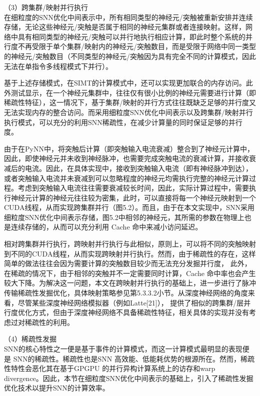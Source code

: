 （3）跨集群/映射并行执行\\
在细粒度的SNN优化中间表示中，所有相同类型的神经元/突触被重新安排并连续存储，无论这些神经元/突触是否属于相同的神经元集群或者连接映射。这样，网络中具有相同类型的神经元/突触可以并行地执行相应计算，即此时整个系统的并行度不再受限于单个集群/映射内的神经元/突触数目，而是受限于网络中同一类型的神经元/突触数目（不同类型的神经元/突触因为具有完全不同的计算模式，因此无法在单指令多线程模式下并行）。

基于上述存储模式，在SIMT的计算模式中，还可以实现更加联合的内存访问。此外测试显示，在一个神经元集群中，往往仅有很小比例的神经元需要进行计算（即稀疏性特征），这一情况下，基于集群/映射的并行方式往往既缺乏足够的并行度又无法实现内存的整合访问。而采用细粒度SNN优化中间表示以及跨集群/映射并行执行模式，可以充分的利用SNN稀疏性，在减少计算量的同时保证足够的并行度。

由于在PyNN中，将突触后计算（即突触输入电流衰减）整合到了神经元计算中，因此，即使神经元并未收到神经脉冲，也需要完成突触电流的衰减计算，并接收衰减后的电流。因此，在具体实现中，接收到突触输入电流（即有神经脉冲到达），或者突触输入电流并未衰减到可以忽略程度的神经元均需执行完整的神经元计算过程。考虑到突触输入电流往往需要衰减较长时间，因此，实际计算过程中，需要执行神经元计算的神经元往往较为密集，此时，可以直接将每一个神经元映射到一个CUDA线程，从而实现跨集群并行（图5.2）。而且，由于在本文实现中，SNN采用细粒度SNN优化中间表示存储，图5.2中相邻的神经元，其所需的参数在物理上也是连续存储的，从而可以充分利用 Cache 命中来减小访问延迟。 

相对跨集群并行执行，跨映射并行执行与此相似，原则上，可以将不同的突触映射到不同的CUDA线程，从而实现跨映射并行执行。然而，由于稀疏性的存在，这样简单的做法往往会因为需要计算的突触数目较少而无法充分发掘并行度， 此外，在稀疏的情况下，由于相邻的突触并不一定需要同时计算，Cache 命中率也会产生较大下降。为解决这一问题，本文在跨映射并行执行的基础上，进一步进行了脉冲传输稀疏性发掘优化，具体映射策略参见第5.3.3.2小节。从深度神经网络的角度来看，尽管某些深度神经网络模拟器（例如Latte[21]）， 提供了相似的跨集群/层并行度优化方式，但由于深度神经网络不具备稀疏性特征，相关具体的实现并没有考虑过对稀疏性的利用。

（4）稀疏性发掘\\
SNN的核心特性之一便是基于事件的计算模式，而这一计算模式最明显的表现便是 SNN的稀疏性。稀疏性也是SNN 高效能、低能耗优势的根源所在。然而，稀疏性特性会恶化其在基于GPGPU 的并行异构计算系统上的访存和warp divergence。因此，本节在细粒度SNN优化中间表示的基础上，引入了稀疏性发掘优化技术以提升SNN的计算效率。

